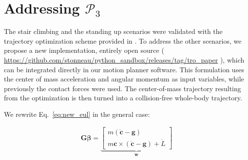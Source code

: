 \documentclass[journal]{IEEEtran}
\newcommand{\mat}[1]{\ensuremath{\begin{bmatrix}#1\end{bmatrix}}}	%
\newcommand{\deladp}[1]{\deleted[id=adp]{#1}}
\providecommand{\DIFaddbegin}{\protect\color{blue}} %
\providecommand{\DIFaddend}{\protect\color{black}} %
\providecommand{\DIFdelbegin}{\protect\cbdelete} %
\providecommand{\DIFdelend}{} %
\begin{document}
\DIFdelend \section{Addressing $\mathcal{P}_3$}
\label{app:optim}
The stair climbing and the standing up scenarios were validated with the trajectory optimization scheme provided in \citeauthor{Carpentier2016}. 
To address the other scenarios, we propose a new implementation, entirely open source (\DIFdelbegin %
\DIFdelend \DIFaddbegin \url{https://github.com/stonneau/python_sandbox/releases/tag/tro_paper} \DIFaddend ), which can be integrated directly in our motion planner software. This formulation uses the center of mass acceleration and angular momentum as input variables, while previously the contact forces were used.
The center-of-mass trajectory resulting from the optimization is then turned into a collision-free whole-body trajectory.

We rewrite Eq.~\ref{eq:new_eul} in the general case:


\begin{align} \label{eq:new_eul_acc}
\mathbf{G} \bm{\beta} = 
\underbrace{\mat{m (\mathbf{\ddot{c}} - \mathbf{g}) \\m \mathbf{c} \times (\mathbf{\ddot{c}} - \mathbf{g}) + \dot{L}}}_{\mathbf{w}}
\end{align}
\end{document}
